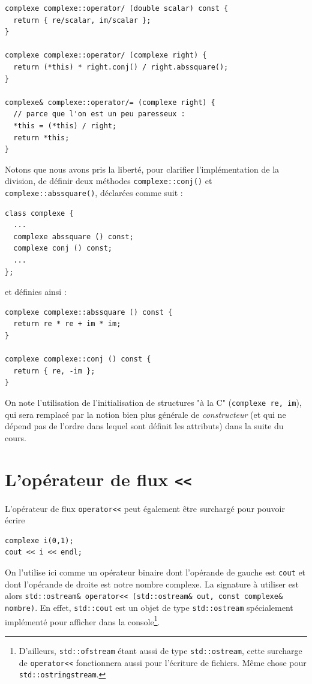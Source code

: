 \documentclass{book}
\newcommand{\inline}[1]{\texttt{#1}}
\begin{document}
\begin{correction}
\begin{verbatim}
complexe complexe::operator/ (double scalar) const {
  return { re/scalar, im/scalar };
}

complexe complexe::operator/ (complexe right) {
  return (*this) * right.conj() / right.abssquare();
}

complexe& complexe::operator/= (complexe right) {
  // parce que l'on est un peu paresseux :
  *this = (*this) / right;
  return *this;
}
\end{verbatim}

Notons que nous avons pris la liberté, pour clarifier l'implémentation de la division, de définir deux méthodes \inline{complexe::conj()} et \inline{complexe::abssquare()}, déclarées comme suit :
\begin{verbatim}
class complexe {
  ...
  complexe abssquare () const;
  complexe conj () const;
  ...
};
\end{verbatim}
et définies ainsi :
\begin{verbatim}
complexe complexe::abssquare () const {
  return re * re + im * im;
}

complexe complexe::conj () const {
  return { re, -im };
}
\end{verbatim}

On note l'utilisation de l'initialisation de structures "à la C" (\inline{complexe {re, im}}), qui sera remplacé par la notion bien plus générale de \emph{constructeur} (et qui ne dépend pas de l'ordre dans lequel sont définit les attributs) dans la suite du cours.

\end{correction}

\section{L'opérateur de flux \texttt{<<}}
L'opérateur de flux \inline{operator<<} peut également être surchargé pour pouvoir écrire
\begin{verbatim}
complexe i(0,1);
cout << i << endl;
\end{verbatim}
On l'utilise ici comme un opérateur binaire dont l'opérande de gauche est \inline{cout} et dont l'opérande de droite est notre nombre complexe. La signature à utiliser est alors \inline{std::ostream& operator<< (std::ostream& out, const complexe& nombre)}. En effet, \inline{std::cout} est un objet de type \inline{std::ostream} spécialement implémenté pour afficher dans la console\footnote{D'ailleurs, \inline{std::ofstream} étant aussi de type \inline{std::ostream}, cette surcharge de \inline{operator<<} fonctionnera aussi pour l'écriture de fichiers. Même chose pour \inline{std::ostringstream}.}.\\
\end{document}
